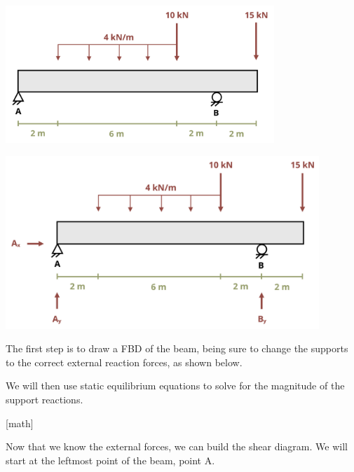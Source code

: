 \documentclass[
  letterpaper,
  DIV=11,
  numbers=noendperiod]{scrreprt}
\begin{document}
\begin{tcolorbox}[enhanced jigsaw, colbacktitle=quarto-callout-note-color!10!white, title={Example 7.3: Draw the shear and moment for the beam shown.}, coltitle=black, leftrule=.75mm, rightrule=.15mm, opacityback=0, breakable, colframe=quarto-callout-note-color-frame, left=2mm, arc=.35mm, colback=white, bottomrule=.15mm, bottomtitle=1mm, toptitle=1mm, titlerule=0mm, opacitybacktitle=0.6, toprule=.15mm]

\begin{center}
\includegraphics[width=3.98958in,height=\textheight]{images/CH7 PNGs/example 7.3 part 1.png}
\end{center}

\begin{center}
\includegraphics[width=4.65625in,height=\textheight]{images/CH7 PNGs/example 7.3 part 2.png}
\end{center}

The first step is to draw a FBD of the beam, being sure to change the
supports to the correct external reaction forces, as shown below.

We will then use static equilibrium equations to solve for the magnitude
of the support reactions.

{[}math{]}

Now that we know the external forces, we can build the shear diagram. We
will start at the leftmost point of the beam, point A.


\end{tcolorbox}
\end{document}
